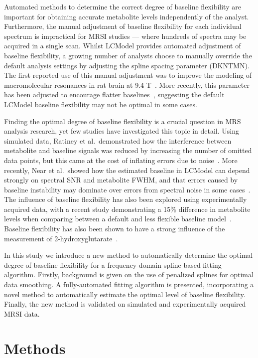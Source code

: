 \documentclass[num-refs]{wiley-article}
\begin{document}
Automated methods to determine the correct degree of baseline flexibility are important for obtaining accurate metabolite levels independently of the analyst. Furthermore, the manual adjustment of baseline flexibility for each individual spectrum is impractical for MRSI studies --- where hundreds of spectra may be acquired in a single scan. Whilst LCModel provides automated adjustment of baseline flexibility, a growing number of analysts choose to manually override the default analysis settings by adjusting the spline spacing parameter (DKNTMN). The first reported use of this manual adjustment was to improve the modeling of macromolecular resonances in rat brain at 9.4 T~\cite{Pfeuffer1999}. More recently, this parameter has been adjusted to encourage flatter baselines~\cite{Deelchand2016,Terpstra2010,Marjanska2018}, suggesting the default LCModel baseline flexibility may not be optimal in some cases.

Finding the optimal degree of baseline flexibility is a crucial question in MRS analysis research, yet few studies have investigated this topic in detail. Using simulated data, Ratiney et al.\ demonstrated how the interference between metabolite and baseline signals was reduced by increasing the number of omitted data points, but this came at the cost of inflating errors due to noise~\cite{Ratiney2004}. More recently, Near et al.\ showed how the estimated baseline in LCModel can depend strongly on spectral SNR and metabolite FWHM, and that errors caused by baseline instability may dominate over errors from spectral noise in some cases~\cite{Near2013}. The influence of baseline flexibility has also been explored using experimentally acquired data, with a recent study demonstrating a 15\% difference in metabolite levels when comparing between a default and less flexible baseline model~\cite{Giapitzakis2019}. Baseline flexibility has also been shown to have a strong influence of the measurement of 2-hydroxyglutarate~\cite{Wenger2019}.

In this study we introduce a new method to automatically determine the optimal degree of baseline flexibility for a frequency-domain spline based fitting algorithm. Firstly, background is given on the use of penalized splines for optimal data smoothing. A fully-automated fitting algorithm is presented, incorporating a novel method to automatically estimate the optimal level of baseline flexibility. Finally, the new method is validated on simulated and experimentally acquired MRSI data.

\section{Methods}
\end{document}
